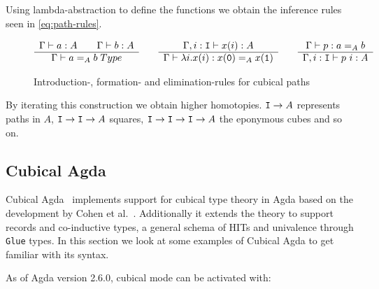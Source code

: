 Using lambda-abstraction to define the functions we obtain the inference rules
seen in \autoref{eq:path-rules}.

\begin{figure}
\begin{equation*}
  \begin{array}[t]{c}
    \Gamma \vdash a : A \qquad \Gamma \vdash b : A\\
    \hline
    \Gamma \vdash a =_A b \; Type\\
  \end{array}
  \qquad
  \begin{array}[t]{c}
    \Gamma, i : \texttt{I} \vdash x(i) : A\\
    \hline
    \Gamma \vdash \lambda i.x(i) : x(\texttt{0}) =_A x(\texttt{1})\\
  \end{array}
  \qquad
  \begin{array}[t]{c}
    \Gamma \vdash p : a =_A b\\
    \hline
    \Gamma, i : \texttt{I} \vdash p~i : A
  \end{array}
\end{equation*}
  \caption{Introduction-, formation- and elimination-rules for cubical paths}
  \label{eq:path-rules}
\end{figure}

By iterating this construction we obtain higher homotopies. $\texttt{I} \rightarrow A$
represents paths in $A$, $\texttt{I} \rightarrow \texttt{I} \rightarrow A$ squares, $\texttt{I} \rightarrow \texttt{I} \rightarrow \texttt{I} \rightarrow A$ the
eponymous cubes and so on.

\subsection{Cubical Agda}
Cubical Agda~\cite{vezzosi2021cubical} implements support for cubical type
theory in Agda based on the development by Cohen et al.~\cite{cohen2016cubical}.
Additionally it extends the theory to support records and co-inductive types, a
general schema of HITs and univalence through \texttt{Glue} types. In this
section we look at some examples of Cubical Agda to get familiar with its
syntax.

As of Agda version 2.6.0, cubical mode can be activated with:
\begin{code}%
\>[0]\AgdaSymbol{\{-\#}\AgdaSpace{}%
\AgdaSpace{}%
\AgdaSpace{}%
\AgdaSymbol{\#-\}}\<%
\end{code}

